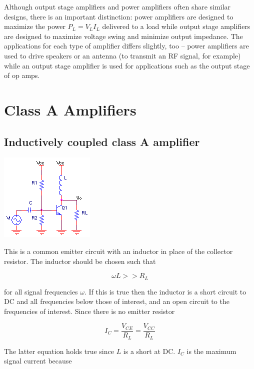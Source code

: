 \par
Although output stage amplifiers and power amplifiers often share similar designs, there is an important distinction: power amplifiers are designed to maximize the power $P_{L} = V_{L}I_{L}$ delivered to a load while output stage amplifiers are designed to maximize voltage swing and minimize output impedance. The applications for each type of amplifier differs slightly, too -- power amplifiers are used to drive speakers or an antenna (to transmit an RF signal, for example) while an output stage amplifier is used for applications such as the output stage of op amps.

\section{Class A Amplifiers}

\subsection{Inductively coupled class A amplifier}
\begin{center}
		\includegraphics{schematics/inductivecommonemitter.png}
\end{center}
This is a common emitter circuit with an inductor in place of the collector resistor. The inductor should be chosen such that

\begin{equation}
\omega L >> R_{L}
\end{equation}

for all signal frequencies $\omega$. If this is true then the inductor is a short circuit to DC and all frequencies below those of interest, and an open circuit to the frequencies of interest. Since there is no emitter resistor

\begin{equation}
I_{C} = \frac{V_{CE}}{R_{L}} = \frac{V_{CC}}{R_{L}}
\end{equation}

The latter equation holds true since $L$ is a short at DC. $I_{C}$ is the maximum signal current because

